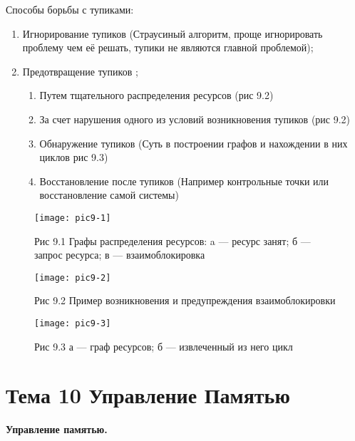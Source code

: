 \begin{utv}
  Способы борьбы с тупиками:
  \begin{enumerate}
    \item Игнорирование тупиков (Страусиный алгоритм, проще игнорировать проблему чем её решать, тупики не являются главной проблемой);
    \item Предотвращение тупиков ;
    \begin{enumerate}
      \item Путем тщательного распределения ресурсов (рис 9.2)
      \item За счет нарушения одного из условий возникновения тупиков (рис 9.2)
      \item Обнаружение тупиков (Суть в построении графов и нахождении в них циклов рис 9.3)
      \item Восстановление после тупиков (Например контрольные точки или восстановление самой системы)
    \end{enumerate}
  \end{enumerate}
\end{utv}

\begin{figure}[h]
  \begin{center}
  \texttt{[image: pic9-1]}
  \caption{Рис 9.1  Графы распределения ресурсов: a — ресурс занят; б — запрос ресурса; в — взаимоблокировка}
  \end{center}
\end{figure}

\begin{figure}
  \begin{center}
  \texttt{[image: pic9-2]}
  \caption{Рис 9.2 Пример возникновения и предупреждения взаимоблокировки}
  \end{center}
\end{figure}

\begin{figure}
  \begin{center}
  \texttt{[image: pic9-3]}
  \caption{Рис 9.3  а — граф ресурсов; б — извлеченный из него цикл}
  \end{center}
\end{figure}


\newpage
\chapter{Тема 10 Управление Памятью}

\begin{center}{\bfseries Управление памятью.}
\end{center}

